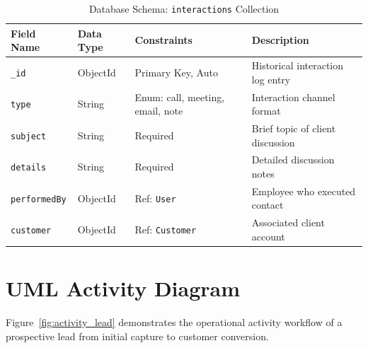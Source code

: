 \begin{table}[h!]
\centering
\caption{Database Schema: \texttt{interactions} Collection}
\label{tab:schema_interaction}
\renewcommand{\arraystretch}{1.2}
\begin{tabular}{|p{3cm}|p{3cm}|p{3.5cm}|p{4.5cm}|}
\hline
\textbf{Field Name} & \textbf{Data Type} & \textbf{Constraints} & \textbf{Description} \\ \hline
\texttt{\_id} & ObjectId & Primary Key, Auto & Historical interaction log entry \\ \hline
\texttt{type} & String & Enum: call, meeting, email, note & Interaction channel format \\ \hline
\texttt{subject} & String & Required & Brief topic of client discussion \\ \hline
\texttt{details} & String & Required & Detailed discussion notes \\ \hline
\texttt{performedBy} & ObjectId & Ref: \texttt{User} & Employee who executed contact \\ \hline
\texttt{customer} & ObjectId & Ref: \texttt{Customer} & Associated client account \\ \hline
\end{tabular}
\end{table}

\section{UML Activity Diagram}
Figure~\ref{fig:activity_lead} demonstrates the operational activity workflow of a prospective lead from initial capture to customer conversion.

